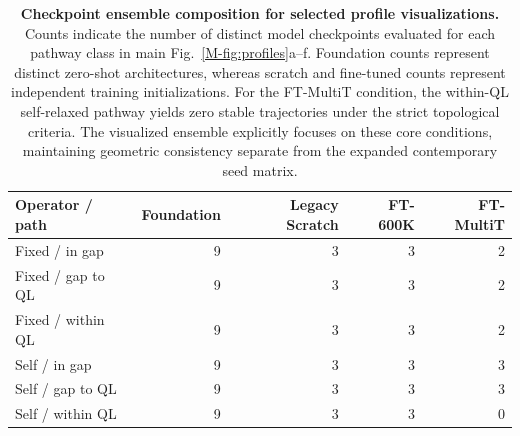 \documentclass[pdflatex,sn-mathphys-num]{sn-jnl}
\begin{document}
\begin{table}[htbp]
\centering\scriptsize
\caption{\textbf{Checkpoint ensemble composition for selected profile visualizations.} Counts indicate the number of distinct model checkpoints evaluated for each pathway class in main Fig.~\ref{M-fig:profiles}a--f. Foundation counts represent distinct zero-shot architectures, whereas scratch and fine-tuned counts represent independent training initializations. For the FT-MultiT condition, the within-QL self-relaxed pathway yields zero stable trajectories under the strict topological criteria. The visualized ensemble explicitly focuses on these core conditions, maintaining geometric consistency separate from the expanded contemporary seed matrix.}
\label{tab:profile_coverage}
\begin{tabular}{lrrrr}
\toprule
Operator / path & Foundation & Legacy Scratch & FT-600K & FT-MultiT\\
\midrule
Fixed / in gap & 9 & 3 & 3 & 2\\
Fixed / gap to QL & 9 & 3 & 3 & 2\\
Fixed / within QL & 9 & 3 & 3 & 2\\
Self / in gap & 9 & 3 & 3 & 3\\
Self / gap to QL & 9 & 3 & 3 & 3\\
Self / within QL & 9 & 3 & 3 & 0\\
\bottomrule
\end{tabular}
\end{table}

\begin{table}[htbp]
\centering\small
\caption{\textbf{Canonical fixed-path reference discrepancies.} Absolute energy discrepancies relative to the canonical task peaks (eV). Trained conditions report the mean $\pm$ sample standard deviation across three independent training seeds; foundation entries represent individual zero-shot checkpoints. Statistics are derived from the comprehensive 120-record matrix detailed in Fig.~\ref{M-fig:taskmatrix}b. Migration benchmarks are evaluated directly on the fully relaxed first-principles coordinates. Sliding discrepancies serve as localized scalar metrics, complementing the comprehensive full-profile and endpoint-return structural diagnostics.}
\label{tab:current_neb_errors}
\resizebox{\textwidth}{!}{}
\end{table}
\begin{table}[htbp]
\centering\scriptsize
\caption{\textbf{Legacy QE pathway references.} Forward and reverse peak values are evaluated explicitly relative to their respective endpoints. These first-principles pathway calculations establish rigorous physical baselines, maintaining clear methodological separation from the subsequent model-relaxed trajectories. This legacy collection remains structurally distinct from the canonical main-figure reference set.}
\label{tab:dft_neb_barriers_revised}
\resizebox{\textwidth}{!}{}
\end{table}
\end{document}
